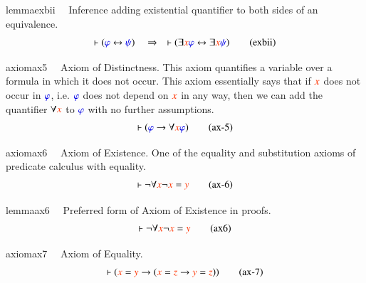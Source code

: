 \begin{restatable}{lemma}{exbii}~~ Inference adding existential quantifier to
both sides of an equivalence.
       ~
\begin{align}
\vdash ( \mw{\varphi} \leftrightarrow \mw{\psi} )\quad\Rightarrow\quad \vdash (
    \exists \msc{x} \mw{\varphi} \leftrightarrow \exists \msc{x} \mw{\psi}
    )\label{eq:exbii}\tag{exbii}
\end{align}
\end{restatable}

\begin{restatable}{axiom}{ax5}~~ Axiom of Distinctness.  This axiom quantifies a
variable over a formula
       in which it does not occur.         This axiom essentially says that if $\msc{x}$ does not occur in
$\mw{\varphi}$,
       i.e. $\mw{\varphi}$ does not depend on $\msc{x}$ in any way, then we
can add the
       quantifier $\forall \msc{x}$ to $\mw{\varphi}$ with no further
assumptions.  
\begin{align}
\vdash ( \mw{\varphi} \rightarrow \forall \msc{x} \mw{\varphi}
    )\label{eq:ax-5}\tag{ax-5}
\end{align}
\end{restatable}

\begin{restatable}{axiom}{ax6}~~ Axiom of Existence.  One of the equality and
substitution axioms of
     predicate calculus with equality.  
\begin{align}
\vdash \lnot \forall \msc{x} \lnot \msc{x} = \msc{y}\label{eq:ax-6}\tag{ax-6}
\end{align}
\end{restatable}

\begin{restatable}{lemma}{ax6}~~ Preferred form of Axiom of Existence in proofs.
\begin{align}
\vdash \lnot \forall \msc{x} \lnot \msc{x} = \msc{y}\label{eq:ax6}\tag{ax6}
\end{align}
\end{restatable}

\begin{restatable}{axiom}{ax7}~~ Axiom of Equality.  
\begin{align}
\vdash ( \msc{x} = \msc{y} \rightarrow ( \msc{x} = \msc{z} \rightarrow \msc{y}
    = \msc{z} ) )\label{eq:ax-7}\tag{ax-7}
\end{align}
\end{restatable}

